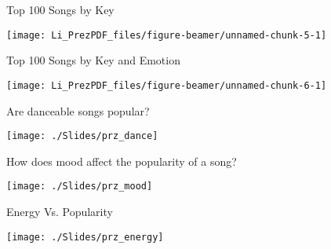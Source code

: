 \documentclass[ignorenonframetext,]{beamer}
\begin{document}
\begin{frame}{Top 100 Songs by Key}
\protect\hypertarget{top-100-songs-by-key}{}

\begin{center}\texttt{[image: Li\_PrezPDF\_files/figure-beamer/unnamed-chunk-5-1]} \end{center}

\end{frame}

\begin{frame}{Top 100 Songs by Key and Emotion}
\protect\hypertarget{top-100-songs-by-key-and-emotion}{}

\begin{center}\texttt{[image: Li\_PrezPDF\_files/figure-beamer/unnamed-chunk-6-1]} \end{center}

\end{frame}

\begin{frame}{Are danceable songs popular?}
\protect\hypertarget{are-danceable-songs-popular}{}

\begin{center}\texttt{[image: ./Slides/prz\_dance]} \end{center}

\end{frame}

\begin{frame}{How does mood affect the popularity of a song?}
\protect\hypertarget{how-does-mood-affect-the-popularity-of-a-song}{}

\begin{center}\texttt{[image: ./Slides/prz\_mood]} \end{center}

\end{frame}

\begin{frame}{Energy Vs. Popularity}
\protect\hypertarget{energy-vs.-popularity}{}

\begin{center}\texttt{[image: ./Slides/prz\_energy]} \end{center}

\end{frame}
\end{document}
